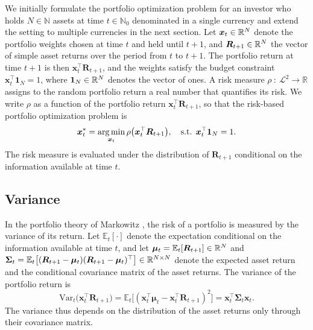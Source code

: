 We initially formulate the portfolio optimization problem for an investor who holds $N\in\mathbb{N}$ assets at time $t\in\mathbb{N}_0$ denominated in a single currency and extend the setting
to multiple currencies in the next section. Let $\bm{x}_t \in \mathbb{R}^N$ denote the portfolio weights chosen at time $t$ and
held until $t+1$, and $\bm{R}_{t+1} \in \mathbb{R}^N$ the vector of simple asset returns over the period from $t$ to $t+1$. The
portfolio return at time $t+1$ is then $\bm{x}_t^\top \bm{R}_{t+1}$, and the weights satisfy the budget constraint
$\bm{x}_t^\top \bm{1}_N = 1$, where $\bm{1}_N \in \mathbb{R}^N$ denotes the vector of ones. A risk measure $\rho \ : \ \mathcal{L}^2\to\mathbb{R}$ assigns to the
random portfolio return a real number that quantifies its risk. We write 
$\rho$ as a function of the portfolio return $\bm{x}_t^\top \bm{R}_{t+1}$, so that the risk-based portfolio optimization problem is
\begin{equation} \label{eq:risk-based-problem}
    \bm{x}_t^* = \operatorname*{arg\,min}_{\bm{x}_t} \rho\bigl( \bm{x}_t^\top \bm{R}_{t+1} \bigr), \quad \text{s.t. } \bm{x}_t^\top \bm{1}_N = 1.
\end{equation}
The risk measure is evaluated under the distribution of $\bm{R}_{t+1}$ conditional on the information available at time
$t$.

\subsection{Variance}\label{sec:risk-variance}

In the portfolio theory of Markowitz \cite{Markowitz1952}, the risk of a portfolio is measured by the variance of its
return. Let $\mathbb{E}_t[\cdot]$ denote the expectation conditional on the information available at time $t$, and let
$\bm{\mu}_t = \mathbb{E}_t[\bm{R}_{t+1}] \in \mathbb{R}^N$ and
$\bm{\Sigma}_t = \mathbb{E}_t\bigl[ (\bm{R}_{t+1} - \bm{\mu}_t)(\bm{R}_{t+1} - \bm{\mu}_t)^\top \bigr] \in \mathbb{R}^{N \times N}$
denote the expected asset return and the conditional covariance matrix of the asset returns. The variance of the portfolio
return is
\begin{equation*}
    \text{Var}_t\bigl( \bm{x}_t^\top \bm{R}_{t+1} \bigr)
    = \mathbb{E}_t\bigl[ (\bm{x}_t^\top \bm{\mu}_t - \bm{x}_t^\top \bm{R}_{t+1})^2 \bigr]
    = \bm{x}_t^\top \bm{\Sigma}_t \bm{x}_t.
\end{equation*}
The variance thus depends on the distribution of the asset returns only through their covariance matrix.

